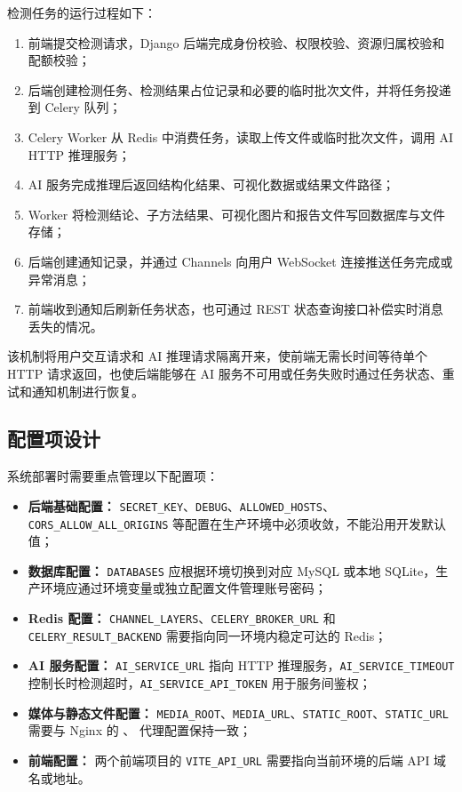 检测任务的运行过程如下：
\begin{enumerate}[leftmargin=2em]
    \item 前端提交检测请求，Django 后端完成身份校验、权限校验、资源归属校验和配额校验；
    \item 后端创建检测任务、检测结果占位记录和必要的临时批次文件，并将任务投递到 Celery 队列；
    \item Celery Worker 从 Redis 中消费任务，读取上传文件或临时批次文件，调用 AI HTTP 推理服务；
    \item AI 服务完成推理后返回结构化结果、可视化数据或结果文件路径；
    \item Worker 将检测结论、子方法结果、可视化图片和报告文件写回数据库与文件存储；
    \item 后端创建通知记录，并通过 Channels 向用户 WebSocket 连接推送任务完成或异常消息；
    \item 前端收到通知后刷新任务状态，也可通过 REST 状态查询接口补偿实时消息丢失的情况。
\end{enumerate}

该机制将用户交互请求和 AI 推理请求隔离开来，使前端无需长时间等待单个 HTTP 请求返回，也使后端能够在 AI 服务不可用或任务失败时通过任务状态、重试和通知机制进行恢复。

\subsection{配置项设计}
系统部署时需要重点管理以下配置项：
\begin{itemize}[leftmargin=2em]
    \item \textbf{后端基础配置：} \texttt{SECRET\_KEY}、\texttt{DEBUG}、\texttt{ALLOWED\_HOSTS}、\texttt{CORS\_ALLOW\_ALL\_ORIGINS} 等配置在生产环境中必须收敛，不能沿用开发默认值；
    \item \textbf{数据库配置：} \texttt{DATABASES} 应根据环境切换到对应 MySQL 或本地 SQLite，生产环境应通过环境变量或独立配置文件管理账号密码；
    \item \textbf{Redis 配置：} \texttt{CHANNEL\_LAYERS}、\texttt{CELERY\_BROKER\_URL} 和 \texttt{CELERY\_RESULT\_BACKEND} 需要指向同一环境内稳定可达的 Redis；
    \item \textbf{AI 服务配置：} \texttt{AI\_SERVICE\_URL} 指向 HTTP 推理服务，\texttt{AI\_SERVICE\_TIMEOUT} 控制长时检测超时，\texttt{AI\_SERVICE\_API\_TOKEN} 用于服务间鉴权；
    \item \textbf{媒体与静态文件配置：} \texttt{MEDIA\_ROOT}、\texttt{MEDIA\_URL}、\texttt{STATIC\_ROOT}、\texttt{STATIC\_URL} 需要与 Nginx 的 、 代理配置保持一致；
    \item \textbf{前端配置：} 两个前端项目的 \texttt{VITE\_API\_URL} 需要指向当前环境的后端 API 域名或地址。
\end{itemize}

